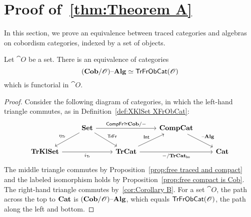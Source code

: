 \documentclass[12pt,oneside,article,draft]{memoir}
\begin{document}
\section{Proof of~\ref{thm:Theorem A}}\label{sec:proof of A}

In this section, we prove an equivalence between traced categories and algebras on cobordism categories, indexed by a set of objects. 

\begin{proposition}\label{prop:natural equivalence cob-O and traced-O}
	Let $\cat{O}$ be a set.
	There is an equivalence of categories
		$$(\mathbf{Cob}/\mathscr{O}){\text \textendash}\mathbf{Alg}\simeq\mathsf{TrFrObCat}(\mathscr{O})$$
	which is functorial in $\cat{O}$.
\end{proposition}
\begin{proof}
	Consider the following diagram of categories, in which the left-hand triangle commutes, as in Definition~\ref{def:XKlSet XFrObCat}:
	$$
	\begin{tikzcd}
		&\Set\ar[rr,"\Fun{CompFr}\iso\Cob/-"]\ar[dl,"\eta_{\Fun{Tr}}"']\ar[dr,"\Fun{TrFr}"]&&\CompCat\ar[dr,"\alg"] \\
		\ncat{TrKlSet}\ar[rr,"i_{\Fun{Tr}}"']&&\TrCat\ar[ur,"\Fun{Int}"]\ar[rr,"-/\TrCat_{\bo}"']
			&&\Cat
	\end{tikzcd}
	$$
	The middle triangle commutes by Proposition~\ref{prop:free traced and compact} and the labeled isomorphism holds by Proposition~\ref{prop:free compact is Cob}.
	The right-hand triangle commutes by~\ref{cor:Corollary B}.
	For a set $\cat{O}$, the path across the top to $\mathbf{Cat}$ is $(\mathbf{Cob}/\mathscr{O}){\text \textendash}\mathbf{Alg}$, which equals $\mathsf{TrFrObCat}(\mathscr{O})$, the path along the left and bottom.
\end{proof}
\end{document}
